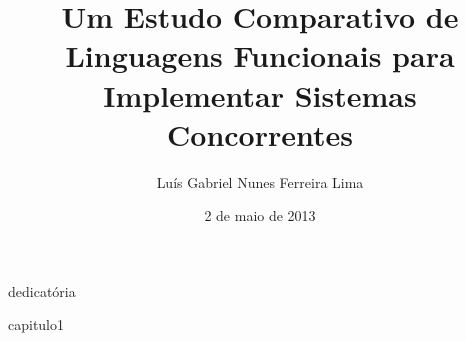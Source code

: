 \documentclass[bsc,oneside]{ufpethesis/ufpethesis}
\title{Um Estudo Comparativo de Linguagens Funcionais para Implementar Sistemas Concorrentes}
\author{Luís Gabriel Nunes Ferreira Lima}
\date{2 de maio de 2013}
\institute{Centro de Informática}
\begin{document}
\frontmatter

\frontpage

\presentationpage

\begin{dedicatory}
dedicatória
\end{dedicatory}

\acknowledgements


\resumo


\abstract


\tableofcontents

\mainmatter

 {capitulo1}




\backmatter

\nocite{*}


\end{document}

